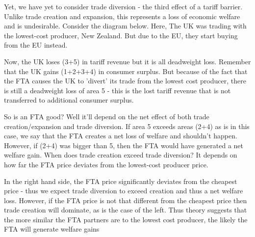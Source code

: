 Yet, we have yet to consider trade diversion - the third effect of a tariff barrier. Unlike trade creation and expansion, this represents a loss of economic welfare and is undesirable. Consider the diagram below. Here, The UK was trading with the lowest-cost producer, New Zealand. But due to the EU, they start buying from the EU instead.

Now, the UK loses (3+5) in tariff revenue but it is all deadweight loss. Remember that the UK gains (1+2+3+4) in consumer surplus. But because of the fact that the FTA causes the UK to 'divert' its trade from the lowest cost producer, there is still a deadweight loss of area 5 - this is the lost tariff revenue that is not transferred to additional consumer surplus.

So is an FTA good? Well it'll depend on the net effect of both trade creation/expansion and trade diversion. If area 5 exceeds areas (2+4) as is in this case, we say that the FTA creates a net loss of welfare and shouldn't happen. However, if (2+4) was bigger than 5, then the FTA would have generated a net welfare gain. When does trade creation exceed trade diversion? It depends on how far the FTA price deviates from the lowest-cost producer price.

In the right hand side, the FTA price significantly deviates from the cheapest price - thus we expect trade diversion to exceed creation and thus a net welfare loss. However, if the FTA price is not that different from the cheapest price then trade creation will dominate, as is the case of the left. Thus theory suggests that the more similar the FTA partners are to the lowest cost producer, the likely the FTA will generate welfare gains

